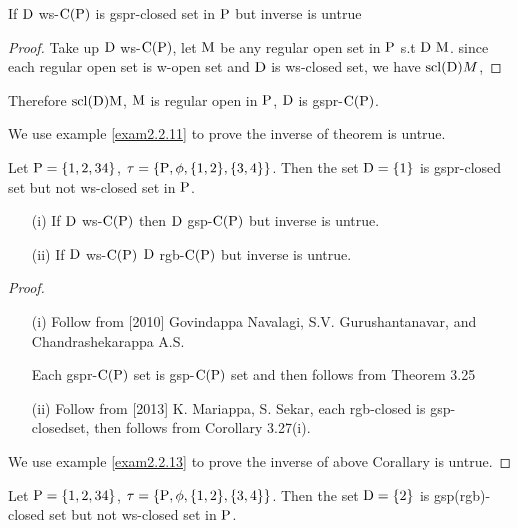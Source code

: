 \begin{thm}\label{thm2.2.10}
If $\mathrm{D}$ ws-$\mathrm{C}(\mathrm{P})$ is gspr-closed set in $\mathrm{P}$ but inverse is untrue
\end{thm}

\begin{proof}
Take up $\mathrm{D}$ ws-$\mathrm{C}(\mathrm{P})$, let $\mathrm{M}$ be any regular open set in $\mathrm{P}$ s.t $\clrD \ \TSM$. since each regular open set is w-open set and $\mathrm{D}$ is ws-closed set, we have $\mathrm{scl}(\mathrm{D})M$,
\end{proof}

Therefore $\mathrm{scl}(\mathrm{D})\mathrm{M}$, $\mathrm{M}$ is regular open in $\mathrm{P}$, $\mathrm{D}$ is gspr-$\mathrm{C}(\mathrm{P})$.

We use example \ref{exam2.2.11} to prove the inverse of theorem is untrue.

\begin{exm}\label{exam2.2.11}
Let $\mathrm{P} = \{1, 2, 3 4\}$, $\tau = \{\mathrm{P},\phi,\{1, 2\}, \{3, 4\}\}$. Then the set $\mathrm{D}= \{1\}$ is gspr-closed set but not ws-closed set in $\mathrm{P}$.
\end{exm}

\begin{coro}\label{coro2.2.12}
\begin{itemize}
\item[(i)] If $\mathrm{D}$ ws-$\mathrm{C}(\mathrm{P})$ then $\mathrm{D}$ gsp-$\mathrm{C}(\mathrm{P})$ but inverse is untrue.
\item[(ii)] If $\mathrm{D}$ ws-$\mathrm{C}(\mathrm{P})$ $\mathrm{D}$ rgb-$\mathrm{C}(\mathrm{P})$ but inverse is untrue.
\end{itemize}
\end{coro}

\begin{proof}
\begin{itemize}
\item[(i)] Follow from [2010] Govindappa Navalagi, S.V. Gurushantanavar, and Chandrashekarappa A.S.

Each gspr-$\mathrm{C}(\mathrm{P})$ set is gsp-$\mathrm{C}(\mathrm{P})$ set and then follows from Theorem 3.25

\item[(ii)] Follow from [2013] K. Mariappa, S. Sekar, each rgb-closed is gsp-closedset, then follows from Corollary 3.27(i).
\end{itemize}
We use example \ref{exam2.2.13} to prove the inverse of above Corallary is untrue.
\end{proof}

\begin{exm}\label{exam2.2.13}
Let $\mathrm{P} = \{1, 2, 3 4\}$, $\tau = \{\mathrm{P}, \phi, \{1, 2\}, \{3, 4\}\}$. Then the set $\mathrm{D}= \{2\}$ is gsp(rgb)-closed set but not ws-closed set in $\mathrm{P}$.
\end{exm}

